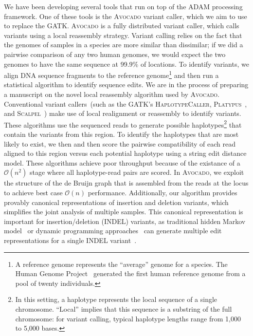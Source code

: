 \documentclass[11pt]{article} %
\begin{document}
We have been developing several tools that run on top of the \textsc{ADAM} processing framework.
One of these tools is the \textsc{Avocado} variant caller, which we aim to use to replace the
\textsc{GATK}. \textsc{Avocado} is a fully distributed variant caller, which calls variants using
a local reassembly strategy. Variant calling relies on the fact that the genomes of samples in
a species are more similar than dissimilar; if we did a pairwise comparison of any two human
genomes, we would expect the two genomes to have the same sequence at 99.9\% of locations. To
identify variants, we align DNA sequence fragments to the reference genome\footnote{A reference
genome represents the ``average'' genome for a species. The Human Genome Project~\cite{lander01}
generated the first human reference genome from a pool of twenty individuals.} and then run a
statistical algorithm to identify sequence edits. We are in the process of preparing a manuscript
on the novel local reassembly algorithm used by \textsc{Avocado}. Conventional variant callers~(such as
the \textsc{GATK}'s \textsc{HaplotypeCaller}, \textsc{Platypus}~\cite{rimmer14}, and
\textsc{Scalpel}~\cite{narzisi14}) make use of local realignment or reassembly to identify
variants. These algorithms use the sequenced reads to generate possible haplotypes\footnote{In
this setting, a haplotype represents the local sequence of a single chromosome. ``Local'' implies that
this sequence is a substring of the full chromosome: for variant calling, typical haplotype lengths
range from 1,000 to 5,000 bases.} that contain the variants from this region. To identify the
haplotypes that are most likely to exist, we then and then score the pairwise compatibility of
each read aligned to this region versus each potential haplotype using a string edit distance model.
These algorithms achieve poor throughput because of the existance of a $\mathcal{O}(n^2)$ stage
where all haplotype-read pairs are scored. In \textsc{Avocado}, we exploit the structure of the
de Bruijn graph that is assembled from the reads at the locus to achieve best case
$\mathcal{O}(n)$ performance. Additionally, our algorithm provides provably canonical
representations of insertion and deletion variants, which simplifies the joint analysis of multiple
samples. This canonical representation is important for insertion/deletion (INDEL) variants, as
traditional hidden Markov model~\cite{durbin98} or dynamic programming approaches~\cite{smith81}
can generate multiple edit representations for a single INDEL variant~\cite{paten14}.
\end{document}

